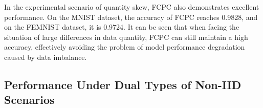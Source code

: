 \documentclass[journal,twoside,web]{ieeecolor}
\begin{document}
\begin{table}[h]        %
\caption{Test Accuracy on MNIST and FEMNIST Under Single Types of Non-IID Scenarios}
\label{tab:single}
\centering
\footnotesize
{}
\end{table}

In the experimental scenario of quantity skew, FCPC also demonstrates excellent performance. On the MNIST dataset, the accuracy of FCPC reaches 0.9828, and on the FEMNIST dataset, it is 0.9724. It can be seen that when facing the situation of large differences in data quantity, FCPC can still maintain a high accuracy, effectively avoiding the problem of model performance degradation caused by data imbalance.





\subsection{Performance Under Dual Types of Non-IID Scenarios}
\end{document}

